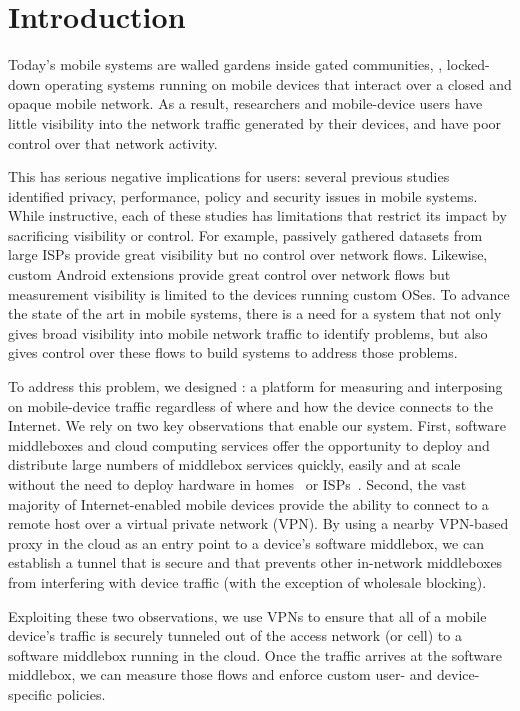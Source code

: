 \section{Introduction}
\label{sec:introduction}

Today's mobile systems are walled gardens inside gated communities, \ie{}, locked-down operating systems 
running on mobile devices that interact over a closed and opaque mobile network. As a result, 
researchers and mobile-device users have little visibility into the network traffic generated by their devices, and have 
poor control over that network activity. 

This has serious negative implications for users: several previous studies~\cite{vallina-rod:ads,gerber:passivespeed,chen:wifi,enck:taintdroid,wang:middleboxes,sommers:cellwifi} 
identified privacy, performance, policy and security issues in mobile systems. While instructive, each of these studies 
has limitations that restrict its impact by sacrificing visibility or control. For example, passively gathered datasets from large 
ISPs provide great visibility but no control over network flows. Likewise, custom Android extensions provide 
great control over network flows but measurement visibility is limited to the devices running custom OSes. 
To advance the state of the art in mobile systems, there is a need for a system that not only gives 
broad visibility into mobile network traffic to identify problems, but also gives control over these flows 
to build systems to address those problems. 

To address this problem, we designed \meddle:  a platform for measuring and interposing on mobile-device 
traffic regardless of where and how the device connects to the Internet. We rely on two key observations that enable our system. First, 
software middleboxes and cloud computing services offer the opportunity to deploy and distribute large numbers 
of middlebox services quickly, easily and at scale~\cite{sherry:middleboxes} without 
the need to deploy hardware in homes~\cite{bismarck} or ISPs~\cite{wang:middleboxes}. Second, 
the vast majority of Internet-enabled mobile devices provide the ability to connect to a remote host over a virtual private 
network (VPN). By using a nearby VPN-based proxy in the cloud as an entry point to a device's software middlebox, we can 
establish a tunnel that is secure and that prevents other in-network middleboxes from interfering with 
device traffic (with the exception of wholesale blocking). 

Exploiting these two observations, we use VPNs to ensure that all of a mobile device's traffic is 
securely tunneled out of the access network (\wifi or cell) to a software middlebox running 
in the cloud. Once the traffic arrives at the software middlebox, we can measure those flows 
and enforce custom user- and device-specific policies. 

